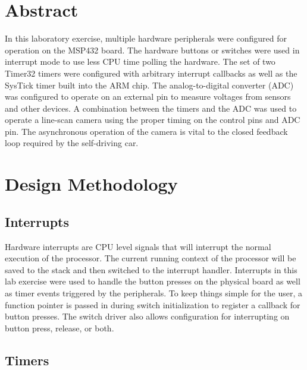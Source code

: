 \documentclass[CMPE]{../KGCOEReport}
\begin{document}
    \maketitle
    \section*{Abstract}

    In this laboratory exercise, multiple hardware peripherals were configured for
    operation on the MSP432 board. The hardware buttons or switches were used in
    interrupt mode to use less CPU time polling the hardware.
    The set of two Timer32 timers were configured with arbitrary interrupt callbacks as
    well as the SysTick timer built into the ARM chip. The analog-to-digital converter
    (ADC) was configured to operate on an external pin to measure voltages from
    sensors and other devices. A combination between the timers and the ADC was used
    to operate a line-scan camera using the proper timing on the control pins and ADC pin.
    The asynchronous operation of the camera is vital to the closed feedback loop required
    by the self-driving car.

    \section*{Design Methodology}

	\subsection*{Interrupts}

	Hardware interrupts are CPU level signals that will interrupt the normal execution
	of the processor. The current running context of the processor will be saved to
	the stack and then switched to the interrupt handler. Interrupts in this
	lab exercise were used to handle the button presses on the physical board as well
	as timer events triggered by the peripherals. To keep
	things simple for the user, a function pointer is passed in during switch
	initialization to register a callback for button presses. The switch driver also allows
	configuration for interrupting on button press, release, or both.

	\subsection*{Timers}
\end{document}
